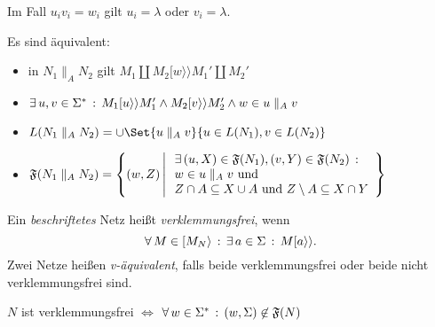 \documentclass{cheat-sheet}
\newcommand{\activeTransition}[1]{[{#1}\rangle} %
\newcommand{\labelledTransition}[1]{[{#1}\rangle\rangle} %
\newcommand{\Failure}{\mathfrak{F}} %
\newcommand{\parallelComposition}{\parallel} %
\begin{document}
\begin{bem}
  Im Fall $u_i v_i = w_i$ gilt $u_i = \lambda$ oder $v_i = \lambda$.
\end{bem}

\begin{lem}
  Es sind äquivalent:
  \begin{itemize}
    \item in $N_1 \parallelComposition_A N_2$ gilt $M_1 \amalg M_2 \labelledTransition{w} M_1' \amalg M_2'$
    \item $\ex{u, v \in \Sigma^*} M_1 \labelledTransition{u} M_1' \wedge M_2 \labelledTransition{v} M_2' \wedge w \in u \parallelComposition_A v$
  \end{itemize}
\end{lem}

\begin{satz}
  \begin{itemize}
    \item $L(N_1 \parallelComposition_A N_2) = \cup \Set{u \parallelComposition_A v}{u \in L(N_1), v \in L(N_2)}$
    \item
      $
        \Failure(N_1 \parallelComposition_A N_2) =
        \left\{
        (w, Z)
        \,\middle|\,
        \begin{array}{l}
          \ex{(u, X) \in \Failure(N_1), (v, Y) \in \Failure(N_2)} \\
          w \in u \parallelComposition_A v \text{ und } \\
          Z \cap A \subseteq X \cup A \text{ und } Z \setminus A \subseteq X \cap Y
        \end{array}
        \right\}
      $
  \end{itemize}
\end{satz}


\begin{defn}
  Ein \textit{beschriftetes} Netz heißt \emph{verklemmungsfrei}, wenn
  \[
    \fa{M \in \activeTransition{M_N}} \ex{a \in \Sigma} M \labelledTransition{a}.
  \]
  Zwei Netze heißen \emph{v-äquivalent}, falls beide verklemmungsfrei oder beide nicht verklemmungsfrei sind.
\end{defn}

\begin{lem}
  $N$ ist verklemmungsfrei $\iff$ $\fa{w \in \Sigma^*} (w, \Sigma) \not\in \Failure(N)$
\end{lem}
\end{document}
